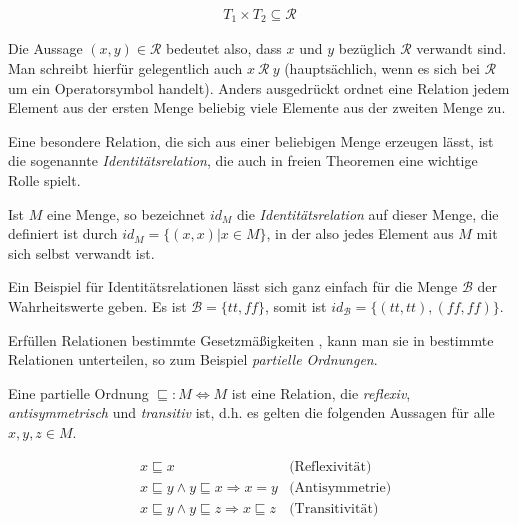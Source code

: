 \begin{align*}
T_1 \times T_2 \subseteq \mathcal{R}
\end{align*}

Die Aussage $(x, y) \in \mathcal{R}$ bedeutet also, dass $x$ und $y$ bezüglich $\mathcal{R}$ verwandt sind. Man schreibt hierfür
gelegentlich auch $x\ \mathcal{R}\ y$ (hauptsächlich, wenn es sich bei $\mathcal{R}$ um ein Operatorsymbol handelt).
Anders ausgedrückt ordnet eine Relation jedem Element aus der ersten Menge beliebig viele Elemente aus der zweiten Menge zu.

Eine besondere Relation, die sich aus einer beliebigen Menge erzeugen lässt, ist die sogenannte \textit{Identitätsrelation}, die
auch in freien Theoremen eine wichtige Rolle spielt.

\begin{mydef}
Ist $M$ eine Menge, so bezeichnet $id_{M}$ die \textit{Identitätsrelation} auf dieser Menge, die definiert ist durch
$id_{M} = \{ (x, x) | x \in M \}$, in der also jedes Element aus $M$ mit sich selbst verwandt ist.
\end{mydef}

Ein Beispiel für Identitätsrelationen lässt sich ganz einfach für die Menge $\mathcal{B}$ der Wahrheitswerte geben. Es ist
$\mathcal{B} = \{ tt, ff \}$, somit ist $id_{\mathcal{B}} = \{ (tt, tt), (ff, ff) \}$.



Erfüllen Relationen bestimmte Gesetzmäßigkeiten , kann man sie in bestimmte Relationen unterteilen, so zum Beispiel
\textit{partielle Ordnungen}.

\begin{mydef}
Eine partielle Ordnung $\sqsubseteq : M \Leftrightarrow M$ ist eine Relation, die \textit{reflexiv}, \textit{antisymmetrisch} und \textit{transitiv} ist, d.h. es gelten die folgenden Aussagen für alle $x, y, z \in M$.

\begin{align*}
& x \sqsubseteq x & \text{(Reflexivität)} \\
& x \sqsubseteq y \land y \sqsubseteq x \Rightarrow x = y & \text{(Antisymmetrie)} \\
& x \sqsubseteq y \land y \sqsubseteq z \Rightarrow x \sqsubseteq z & \text{(Transitivität)} \\
\end{align*}

\end{mydef}

